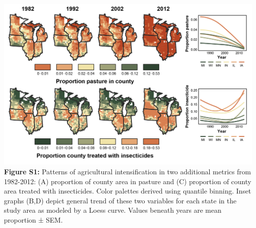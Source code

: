 \documentclass[11pt,]{article}
\begin{document}
\newpage

\includegraphics[width=1\textwidth,height=\textheight]{../ms_figs/fig_s1.png}
\textbf{Figure S1:} Patterns of agricultural intensification in two
additional metrics from 1982-2012: (A) proportion of county area in
pasture and (C) proportion of county area treated with insecticides.
Color palettes derived using quantile binning. Inset graphs (B,D) depict
general trend of these two variables for each state in the study area as
modeled by a Loess curve. Values beneath years are mean proportion ±
SEM. \clearpage

\newpage
\end{document}
